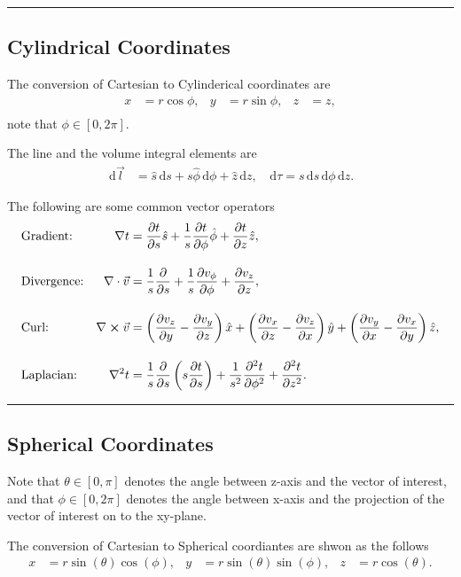 \documentclass[a4paper]{article}
\newcommand{\dmr}[1]{\, \mathrm{d}#1} %
\numberwithin{equation}{subsection}
\begin{document}
\par\noindent\rule{\textwidth}{0.4pt}
\subsection{Cylindrical Coordinates}
The conversion of Cartesian to Cylinderical coordinates\cite{noauthor_cylindrical_2021} are 
\begin{align*}
    x &= r \cos \phi, & y &= r \sin\phi, & z &= z,\\
\end{align*}
note that $\phi \in [0,2\pi].$

The line and the volume integral elements are
\begin{align*}
    \dmr{\vec{l}} &= \hat{s}\dmr{s} + s\hat{\phi}\dmr{\phi}+\hat{z}\dmr{z}, & \dmr{\tau} = s\dmr{s}\dmr{\phi}\dmr{z}.
\end{align*}

The following are some common vector operators
\begin{align*}
    &\text{Gradient:} &\nabla t  &= \pdv{t}{s}\hat{s}+\frac{1}{s}\pdv{t}{\phi}\hat{\phi}+\pdv{t}{z}\hat{z},\\[1em]
    &\text{Divergence:} &\nabla\cdot\vec{v} &= \frac{1}{s}\pdv{}{s}(sv_s)+\frac{1}{s}\pdv{v_\phi}{\phi}+\pdv{v_z}{z},\\[1em]
    &\text{Curl:} &\nabla \cross \vec{v} &= \left(\pdv{v_z}{y}-\pdv{v_y}{z}\right)\hat{x} + \left(\pdv{v_x}{z}-\pdv{v_z}{x}\right)\hat{y} + \left(\pdv{v_y}{x}-\pdv{v_x}{y}\right)\hat{z},\\[1em]
    &\text{Laplacian:} &\laplacian t &= \frac{1}{s}\pdv{}{s}\left(s\pdv{t}{s}\right)+\frac{1}{s^2}\pdv[2]{t}{\phi}+\pdv[2]{t}{z}. 
\end{align*}
\par\noindent\rule{\textwidth}{0.4pt}

\subsection{Spherical Coordinates}
Note that $\theta\in[0,\pi]$ denotes the angle between z-axis and the vector of interest, and that $\phi\in[0, 2\pi]$ denotes the angle between x-axis and the projection of the vector of interest on to the xy-plane.\cite{noauthor_cylindrical_2021}

The conversion of Cartesian to Spherical coordiantes are shwon as the follows
\begin{align*}
    x &= r \sin(\theta)\cos(\phi), & y &= r \sin(\theta)\sin(\phi), & z &= r \cos(\theta).\\
\end{align*}
\end{document}
